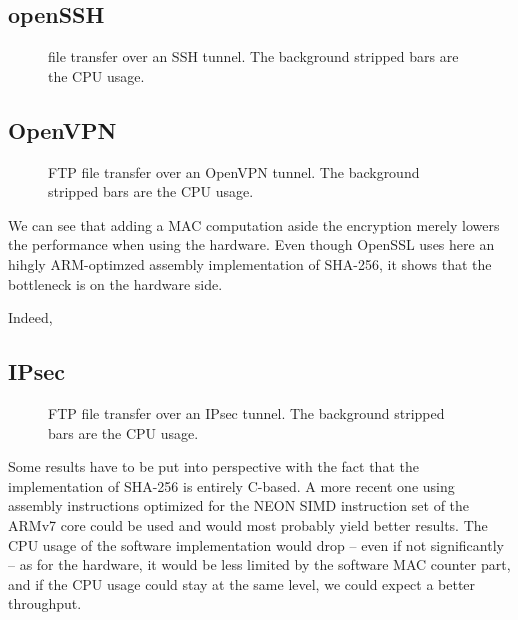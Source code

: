 \subsection{openSSH}

\begin{figure}[ht]

\caption{file transfer over an SSH tunnel. The background stripped bars are the CPU usage.}{}
\label{fig:openssh-bench}
\end{figure}

\subsection{OpenVPN}

\begin{figure}[ht]

\caption{FTP file transfer over an OpenVPN tunnel. The background stripped bars are the CPU usage.}{}
\label{fig:openvpn-ftp-bench}
\end{figure}

We can see that adding a MAC computation aside the encryption merely lowers the performance when using the hardware.
Even though OpenSSL uses here an hihgly ARM-optimzed assembly implementation of SHA-256, it shows that the bottleneck is on the hardware side.

Indeed, 

\subsection{IPsec}

\begin{figure}[ht]

\caption{FTP file transfer over an IPsec tunnel. The background stripped bars are the CPU usage.}{}
\label{fig:ipsec-ftp-bench}
\end{figure}

Some results have to be put into perspective with the fact that the implementation of SHA-256 is entirely C-based.
A more recent one using assembly instructions optimized for the NEON SIMD instruction set of the ARMv7 core could be used and would most probably yield better results.
The CPU usage of the software implementation would drop -- even if not significantly -- as for the hardware, it would be less limited by the software MAC counter part, and if the CPU usage could stay at the same level, we could expect a better throughput.

